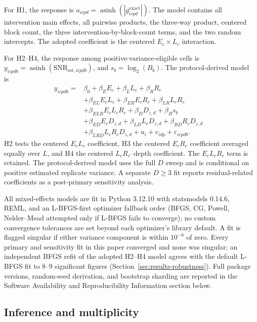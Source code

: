 \documentclass[pdflatex,sn-mathphys-num,Numbered]{sn-jnl}
\begin{document}
For H1, the response is $a_{icpd}=\operatorname{asinh}(|g^{\mathrm{exact}}_{icpd}|)$. The model contains all intervention main effects, all pairwise products, the three-way product, centered block count, the three intervention-by-block-count terms, and the two random intercepts. The adopted coefficient is the centered $E_c\times L_c$ interaction.

For H2--H4, the response among positive-variance-eligible cells is $y_{icpdb}=\operatorname{asinh}(\mathrm{SNR}_{\mathrm{est},icpdb})$, and $s_b=\log_2(B_b)$. The protocol-derived model is
\begin{align*}
y_{icpdb}={}&\beta_0
+\beta_E E_c+\beta_L L_c+\beta_R R_c\\
&+\beta_{EL}E_cL_c+\beta_{ER}E_cR_c+\beta_{LR}L_cR_c\\
&+\beta_{ELR}E_cL_cR_c+\beta_DD_{z,d}+\beta_B s_b\\
&+\beta_{ED}E_cD_{z,d}+\beta_{LD}L_cD_{z,d}+\beta_{RD}R_cD_{z,d}\\
&+\beta_{LRD}L_cR_cD_{z,d}
+u_i+v_{idp}+\varepsilon_{icpdb}.
\end{align*}
H2 tests the centered $E_cL_c$ coefficient, H3 the centered $E_cR_c$ coefficient averaged equally over $L$, and H4 the centered $L_cR_c$--depth coefficient. The $E_cL_cR_c$ term is retained. The protocol-derived model uses the full $D$ sweep and is conditional on positive estimated replicate variance. A separate $D\ge3$ fit reports residual-related coefficients as a post-primary sensitivity analysis.

All mixed-effects models are fit in Python 3.12.10 with statsmodels 0.14.6, REML, and an L-BFGS-first optimizer fallback order (BFGS, CG, Powell, Nelder--Mead attempted only if L-BFGS fails to converge); no custom convergence tolerances are set beyond each optimizer's library default. A fit is flagged singular if either variance component is within $10^{-8}$ of zero. Every primary and sensitivity fit in this paper converged and none was singular; an independent BFGS refit of the adopted H2--H4 model agrees with the default L-BFGS fit to 8--9 significant figures (Section~\ref{sec:results-robustness}). Full package versions, random-seed derivation, and bootstrap sharding are reported in the Software Availability and Reproducibility Information section below.

\subsection{Inference and multiplicity}
\end{document}

